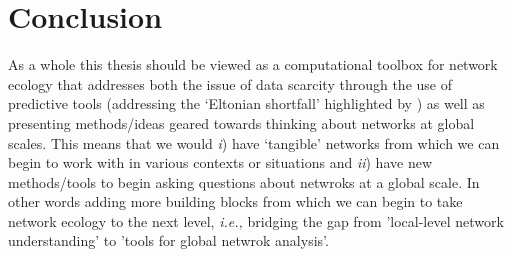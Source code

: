 \section{Conclusion}\label{conclusion}

As a whole this thesis should be viewed as a computational toolbox for
network ecology that addresses both the issue of data scarcity through
the use of predictive tools (addressing the `Eltonian shortfall' highlighted by \cite{Hortal2015SevSho}) as well as presenting methods/ideas geared towards thinking about networks at global scales. This means that we would \emph{i}) have `tangible' networks from which we can begin to work with in various contexts or situations and \emph{ii}) have new methods/tools to begin asking questions about netwroks at a global scale. In other words adding more building blocks from which we can begin to take network ecology to the next level, \emph{i.e.,} bridging the gap from 'local-level network understanding' to 'tools for global netwrok analysis'.



\endinput
